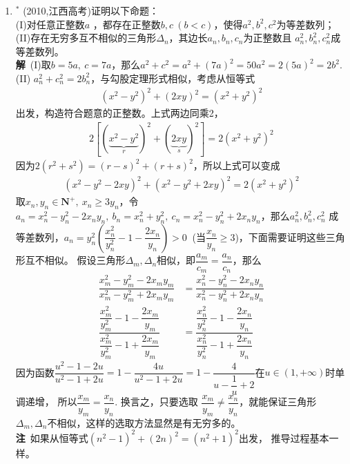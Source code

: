 \begin{enumerate}[label={【\textbf{例\thechapter.\arabic*}】},
 leftmargin=\inteval{\myenumleftmargin}pt,
 itemsep=\inteval{\myenumitempsep}pt,
 itemindent=\inteval{\myenumitemindent}pt]
\item $ ^* $ \label{2010江西高考}
(2010,江西高考)证明以下命题：\\
(I)对任意正整数$ a $ ，都存在正整数$ b,c\ (b<c) $，使得$ a^2,b^2,c^2 $为等差数列；\\
(II)存在无穷多互不相似的三角形$ \Delta_n $，其边长$ a_n,b_n,c_n $为正整数且
$ a_n^2,b_n^2,c_n^2 $成等差数列。\\
\textbf{解}\ (I)取$ b=5a,\ c=7a $，那么$ a^2+c^2=a^2+(7a)^2=50a^2=
2(5a)^2=2b^2 $. \\
(II) $ a_n^2+c_n^2=2b_n^2 $，与勾股定理形式相似，考虑从恒等式
\begin{gather*}
    (x^2-y^2)^2+(2xy)^2=(x^2+y^2)^2
\end{gather*}
出发，构造符合题意的正整数。上式两边同乘2，
\begin{gather*}
    2[(\underbrace{x^2-y^2}_{r})^2+(\underbrace{2xy}_{s})^2]=2(x^2+y^2)^2
\end{gather*}
因为$ 2(r^2+s^2)=(r-s)^2+(r+s)^2 $，所以上式可以变成
\begin{gather*}
    (x^2-y^2-2xy)^2+(x^2-y^2+2xy)^2=2(x^2+y^2)^2
\end{gather*}
取$ x_n,y_n\in \textbf{N}^+,\ x_n\geq 3y_n $，令$ a_n=x_n^2-y_n^2-2x_ny_n,\ 
b_n=x_n^2+y_n^2,\ c_n=x_n^2-y_n^2+2x_ny_n $，那么$ a_n^2,b_n^2,c_n^2 $
成等差数列，$ a_n=y_n^2\left(\dfrac{x_n^2}{y_n^2}-1-\dfrac{2x_n}{y_n}\right)
>0\ $ (当$ \dfrac{x_n}{y_n}\geq 3 $)，下面需要证明这些三角形互不相似。
假设三角形$ \Delta_m,\Delta_n $相似，即$ \dfrac{a_m}{c_m}=
\dfrac{a_n}{c_n} $，那么
\begin{align*}
    \dfrac{x_m^2-y_m^2-2x_my_m}{x_m^2-y_m^2+2x_my_m} &=
    \dfrac{x_n^2-y_n^2-2x_ny_n}{x_n^2-y_n^2+2x_ny_n}  \\
    \dfrac{\dfrac{x_m^2}{y_m^2}-1-\dfrac{2x_m}{y_m}}
    {\dfrac{x_m^2}{y_m^2}-1+\dfrac{2x_m}{y_m}} &=
    \dfrac{\dfrac{x_n^2}{y_n^2}-1-\dfrac{2x_n}{y_n}}
    {\dfrac{x_n^2}{y_n^2}-1+\dfrac{2x_n}{y_n}} 
\end{align*}
因为函数$ \dfrac{u^2-1-2u}{u^2-1+2u}=1-\dfrac{4u}{u^2-1+2u}=1-
\dfrac{4}{u-\dfrac{1}{u}+2} $在$ u\in (1,+\infty) $时单调递增，
所以$ \dfrac{x_m}{y_m}=\dfrac{x_n}{y_n} $. 换言之，只要选取
$ \dfrac{x_m}{y_m}\neq\dfrac{x_n}{y_n} $，就能保证三角形
$ \Delta_m,\Delta_n $不相似，这样的选取方法显然是有无穷多的。\\
\textbf{注}\ 如果从恒等式$ (n^2-1)^2+(2n)^2=(n^2+1)^2 $出发，
推导过程基本一样。


\end{enumerate}
